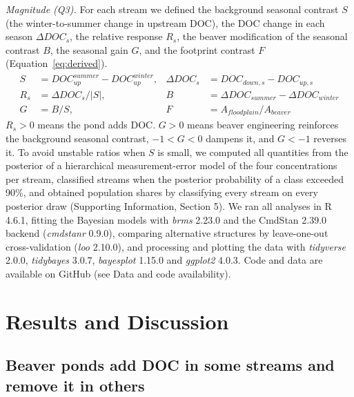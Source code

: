 \documentclass[pdflatex,sn-nature]{sn-jnl}   %
\begin{document}
\emph{Magnitude (Q3).} For each stream we defined the background seasonal contrast \(S\) (the winter-to-summer change in upstream DOC), the DOC change in each season \(\Delta DOC_s\), the relative response \(R_s\), the beaver modification of the seasonal contrast \(B\), the seasonal gain \(G\), and the footprint contrast \(F\) (Equation~\ref{eq:derived}).
\begin{equation}
\begin{aligned}
S &= DOC_{up}^{summer} - DOC_{up}^{winter}, &
\Delta DOC_s &= DOC_{down,s} - DOC_{up,s} \\
R_s &= \Delta DOC_s / |S|, &
B &= \Delta DOC_{summer} - \Delta DOC_{winter} \\
G &= B / S, &
F &= A_{floodplain} / A_{beaver}
\end{aligned}
\label{eq:derived}
\end{equation}
\(R_s > 0\) means the pond adds DOC. \(G > 0\) means beaver engineering reinforces the background seasonal contrast, \(-1 < G < 0\) dampens it, and \(G < -1\) reverses it. To avoid unstable ratios when \(S\) is small, we computed all quantities from the posterior of a hierarchical measurement-error model of the four concentrations per stream, classified streams when the posterior probability of a class exceeded 90\%, and obtained population shares by classifying every stream on every posterior draw (Supporting Information, Section 5). We ran all analyses in R 4.6.1, fitting the Bayesian models with \emph{brms} 2.23.0 and the CmdStan 2.39.0 backend (\emph{cmdstanr} 0.9.0), comparing alternative structures by leave-one-out cross-validation (\emph{loo} 2.10.0), and processing and plotting the data with \emph{tidyverse} 2.0.0, \emph{tidybayes} 3.0.7, \emph{bayesplot} 1.15.0 and \emph{ggplot2} 4.0.3. Code and data are available on GitHub (see Data and code availability).

\FloatBarrier
\section{Results and Discussion}

\subsection{Beaver ponds add DOC in some streams and remove it in others}
\end{document}
